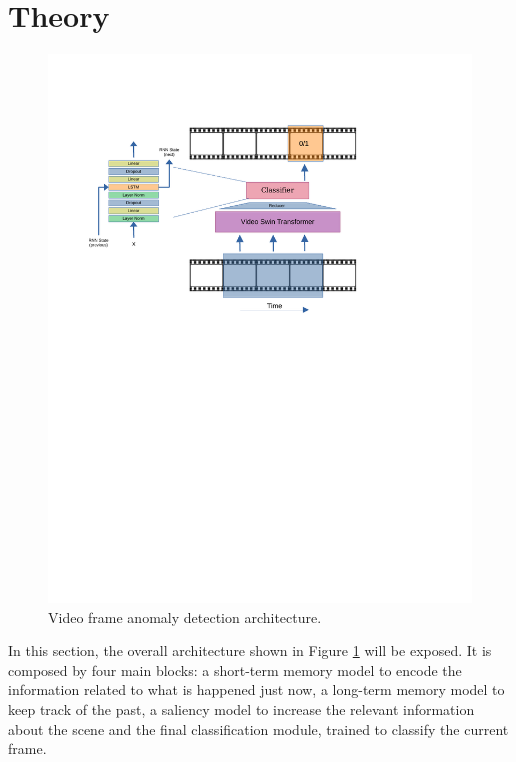 \section{Theory}
\fboxsep=1mm%
\fboxrule=1pt%

\begin{figure}[t]
    \centering
        \includegraphics[trim=40 420 0 100, clip, width=1.\linewidth]{images/arch.pdf}
    \caption{Video frame anomaly detection architecture.}
    \label{fig:arch}
\end{figure}

In this section, the overall architecture shown in Figure \ref{fig:arch} will be exposed.
It is composed by four main blocks: a short-term memory model to encode the information related to what is happened just now, a long-term memory model to keep track of the past, a saliency model to increase the relevant information about the scene and the final classification module, trained to classify the current frame.

